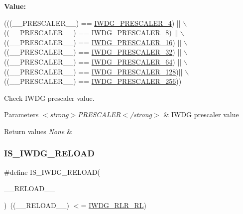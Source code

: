 {\bfseries Value\+:}
\begin{DoxyCode}
(((\_\_PRESCALER\_\_) == \hyperlink{group___i_w_d_g___prescaler_ga470bb195d35ef7a0b75164c228b4ee69}{IWDG\_PRESCALER\_4})  || \(\backslash\)
                                               ((\_\_PRESCALER\_\_) == 
      \hyperlink{group___i_w_d_g___prescaler_ga5f00866f823ee700005e8a753b28ad75}{IWDG\_PRESCALER\_8})  || \(\backslash\)
                                               ((\_\_PRESCALER\_\_) == 
      \hyperlink{group___i_w_d_g___prescaler_gab3eb3c6a10facc8b0dc7c33608f6e129}{IWDG\_PRESCALER\_16}) || \(\backslash\)
                                               ((\_\_PRESCALER\_\_) == 
      \hyperlink{group___i_w_d_g___prescaler_gac3f33494fb7aaa2845ac106858394e03}{IWDG\_PRESCALER\_32}) || \(\backslash\)
                                               ((\_\_PRESCALER\_\_) == 
      \hyperlink{group___i_w_d_g___prescaler_ga52a956c645ce59312c84cbe37b2b20e4}{IWDG\_PRESCALER\_64}) || \(\backslash\)
                                               ((\_\_PRESCALER\_\_) == 
      \hyperlink{group___i_w_d_g___prescaler_ga17901d4e3e52af620acbbb146fd79264}{IWDG\_PRESCALER\_128})|| \(\backslash\)
                                               ((\_\_PRESCALER\_\_) == 
      \hyperlink{group___i_w_d_g___prescaler_ga885221d5bb09157c9e953a1be38556f0}{IWDG\_PRESCALER\_256}))
\end{DoxyCode}


Check I\+W\+DG prescaler value. 


\begin{DoxyParams}{Parameters}
{\em $<$strong$>$\+P\+R\+E\+S\+C\+A\+L\+E\+R$<$/strong$>$} & I\+W\+DG prescaler value \\
\hline
\end{DoxyParams}

\begin{DoxyRetVals}{Return values}
{\em None} & \\
\hline
\end{DoxyRetVals}
\mbox{\label{group___i_w_d_g___private___macros_gad7ade0982243f56ba89ff764534f553c}} 
\subsubsection{\texorpdfstring{I\+S\+\_\+\+I\+W\+D\+G\+\_\+\+R\+E\+L\+O\+AD}{IS\_IWDG\_RELOAD}}
{\footnotesize\ttfamily \#define I\+S\+\_\+\+I\+W\+D\+G\+\_\+\+R\+E\+L\+O\+AD(\begin{DoxyParamCaption}\item[{}]{\+\_\+\+\_\+\+R\+E\+L\+O\+A\+D\+\_\+\+\_\+ }\end{DoxyParamCaption})~((\+\_\+\+\_\+\+R\+E\+L\+O\+A\+D\+\_\+\+\_\+) $<$= \hyperlink{group___peripheral___registers___bits___definition_ga87024bbb19f26def4c4c1510b22d3033}{I\+W\+D\+G\+\_\+\+R\+L\+R\+\_\+\+RL})}



